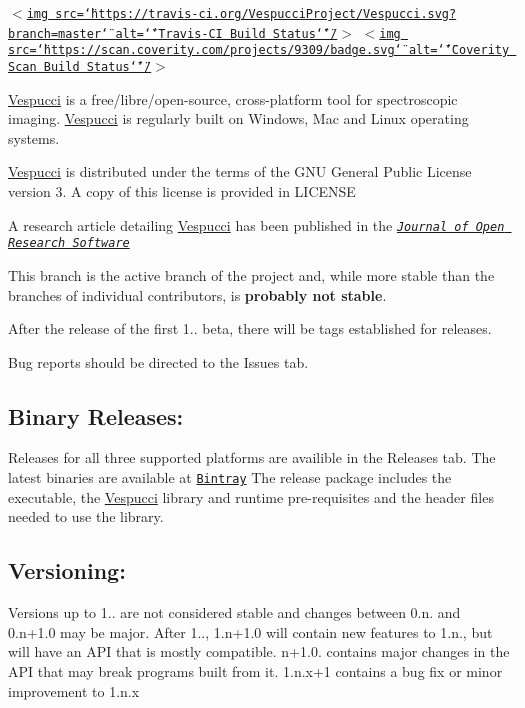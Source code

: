 \href{https://ci.appveyor.com/project/dpfoose/vespucci}{\tt } \href{https://travis-ci.org/VespucciProject/Vespucci}{\tt $<$img src=\char`\"{}https\+://travis-\/ci.\+org/\+Vespucci\+Project/\+Vespucci.\+svg?branch=master\char`\"{} alt=\char`\"{}\char`\"{}Travis-\/\+CI Build Status\char`\"{}\char`\"{}/$>$} \href{https://scan.coverity.com/projects/vespucciproject-vespucci}{\tt $<$img src=\char`\"{}https\+://scan.\+coverity.\+com/projects/9309/badge.\+svg\char`\"{} alt=\char`\"{}\char`\"{}Coverity Scan Build Status\char`\"{}\char`\"{}/$>$}

\hyperlink{namespace_vespucci}{Vespucci} is a free/libre/open-\/source, cross-\/platform tool for spectroscopic imaging. \hyperlink{namespace_vespucci}{Vespucci} is regularly built on Windows, Mac and Linux operating systems.

\hyperlink{namespace_vespucci}{Vespucci} is distributed under the terms of the G\+NU General Public License version 3. A copy of this license is provided in L\+I\+C\+E\+N\+SE

A research article detailing \hyperlink{namespace_vespucci}{Vespucci} has been published in the \href{http://openresearchsoftware.metajnl.com/articles/10.5334/jors.91/}{\tt {\itshape Journal of Open Research Software}}

This branch is the active branch of the project and, while more stable than the branches of individual contributors, is {\bfseries probably not stable}.

After the release of the first 1.. beta, there will be tags established for releases.

Bug reports should be directed to the Issues tab.

\subsection*{Binary Releases\+: }

Releases for all three supported platforms are availible in the Releases tab. The latest binaries are available at \href{https://bintray.com/vespucciproject/Vespucci_automated_builds/Vespucci_latest}{\tt Bintray} The release package includes the executable, the \hyperlink{namespace_vespucci}{Vespucci} library and runtime pre-\/requisites and the header files needed to use the library. \subsection*{Versioning\+: }

Versions up to 1.. are not considered stable and changes between 0.\+n. and 0.\+n+1.0 may be major. After 1.., 1.\+n+1.0 will contain new features to 1.\+n., but will have an A\+PI that is mostly compatible. n+1.0. contains major changes in the A\+PI that may break programs built from it. 1.\+n.\+x+1 contains a bug fix or minor improvement to 1.\+n.\+x

